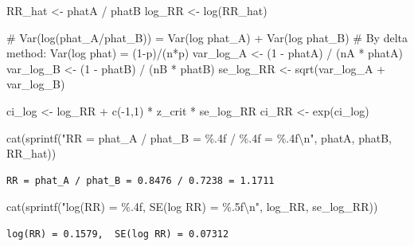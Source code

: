 \documentclass[
  letterpaper,
  DIV=11,
  numbers=noendperiod]{scrartcl}
\newenvironment{Shaded}{\begin{snugshade}}{\end{snugshade}}
\newcommand{\CommentTok}[1]{\textcolor[rgb]{0.37,0.37,0.37}{#1}}
\newcommand{\DecValTok}[1]{\textcolor[rgb]{0.68,0.00,0.00}{#1}}
\newcommand{\FunctionTok}[1]{\textcolor[rgb]{0.28,0.35,0.67}{#1}}
\newcommand{\NormalTok}[1]{\textcolor[rgb]{0.00,0.23,0.31}{#1}}
\newcommand{\OtherTok}[1]{\textcolor[rgb]{0.00,0.23,0.31}{#1}}
\newcommand{\SpecialCharTok}[1]{\textcolor[rgb]{0.37,0.37,0.37}{#1}}
\newcommand{\StringTok}[1]{\textcolor[rgb]{0.13,0.47,0.30}{#1}}
\begin{document}
\begin{Shaded}
\begin{Highlighting}[]
\NormalTok{RR\_hat  }\OtherTok{\textless{}{-}}\NormalTok{ phatA }\SpecialCharTok{/}\NormalTok{ phatB}
\NormalTok{log\_RR  }\OtherTok{\textless{}{-}} \FunctionTok{log}\NormalTok{(RR\_hat)}

\CommentTok{\# Var(log(phat\_A/phat\_B)) = Var(log phat\_A) + Var(log phat\_B)}
\CommentTok{\# By delta method: Var(log phat) = (1{-}p)/(n*p)}
\NormalTok{var\_log\_A }\OtherTok{\textless{}{-}}\NormalTok{ (}\DecValTok{1} \SpecialCharTok{{-}}\NormalTok{ phatA) }\SpecialCharTok{/}\NormalTok{ (nA }\SpecialCharTok{*}\NormalTok{ phatA)}
\NormalTok{var\_log\_B }\OtherTok{\textless{}{-}}\NormalTok{ (}\DecValTok{1} \SpecialCharTok{{-}}\NormalTok{ phatB) }\SpecialCharTok{/}\NormalTok{ (nB }\SpecialCharTok{*}\NormalTok{ phatB)}
\NormalTok{se\_log\_RR }\OtherTok{\textless{}{-}} \FunctionTok{sqrt}\NormalTok{(var\_log\_A }\SpecialCharTok{+}\NormalTok{ var\_log\_B)}

\NormalTok{ci\_log  }\OtherTok{\textless{}{-}}\NormalTok{ log\_RR }\SpecialCharTok{+} \FunctionTok{c}\NormalTok{(}\SpecialCharTok{{-}}\DecValTok{1}\NormalTok{,}\DecValTok{1}\NormalTok{) }\SpecialCharTok{*}\NormalTok{ z\_crit }\SpecialCharTok{*}\NormalTok{ se\_log\_RR}
\NormalTok{ci\_RR   }\OtherTok{\textless{}{-}} \FunctionTok{exp}\NormalTok{(ci\_log)}

\FunctionTok{cat}\NormalTok{(}\FunctionTok{sprintf}\NormalTok{(}\StringTok{"RR = phat\_A / phat\_B = \%.4f / \%.4f = \%.4f}\SpecialCharTok{\textbackslash{}n}\StringTok{"}\NormalTok{,}
\NormalTok{            phatA, phatB, RR\_hat))}
\end{Highlighting}
\end{Shaded}

\begin{verbatim}
RR = phat_A / phat_B = 0.8476 / 0.7238 = 1.1711
\end{verbatim}

\begin{Shaded}
\begin{Highlighting}[]
\FunctionTok{cat}\NormalTok{(}\FunctionTok{sprintf}\NormalTok{(}\StringTok{"log(RR) = \%.4f,  SE(log RR) = \%.5f}\SpecialCharTok{\textbackslash{}n}\StringTok{"}\NormalTok{, log\_RR, se\_log\_RR))}
\end{Highlighting}
\end{Shaded}

\begin{verbatim}
log(RR) = 0.1579,  SE(log RR) = 0.07312
\end{verbatim}
\end{document}
